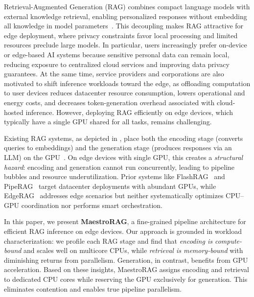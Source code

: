 Retrieval-Augmented Generation (RAG) combines compact language models with external knowledge retrieval, enabling personalized responses without embedding all knowledge in model parameters~\cite{rag_neurips}. This decoupling makes RAG attractive for edge deployment, where privacy constraints favor local processing and limited resources preclude large models. In particular, users increasingly prefer on-device or edge-based AI systems because sensitive personal data can remain local, reducing exposure to centralized cloud services and improving data privacy guarantees. At the same time, service providers and corporations are also motivated to shift inference workloads toward the edge, as offloading computation to user devices reduces datacenter resource consumption, lowers operational and energy costs, and decreases token-generation overhead associated with cloud-hosted inference.
However, deploying RAG efficiently on edge devices, which typically have a single GPU shared for all  tasks, remains challenging.


Existing RAG systems, as depicted in , place both the encoding stage (converts queries to embeddings) and the generation stage (produces responses via an LLM) on the GPU~\cite{jin2024flashrag, jiang2024piperag}. On edge devices with single GPU, this creates a \emph{structural hazard}: encoding and generation cannot run concurrently, leading to pipeline bubbles and resource underutilization. Prior systems like FlashRAG~\cite{jin2024flashrag} and PipeRAG~\cite{jiang2024piperag} target datacenter deployments with abundant GPUs, while EdgeRAG~\cite{EdgeRAG} addresses edge scenarios but neither systematically optimizes CPU--GPU coordination nor performs smart orchestration.

In this paper, we present \textbf{MaestroRAG}, a fine-grained pipeline architecture for efficient RAG inference on edge devices. Our approach is grounded in workload characterization: we profile each RAG stage and find that \emph{encoding is compute-bound} and scales well on multicore CPUs, while \emph{retrieval is memory-bound} with diminishing returns from parallelism. Generation, in contrast, benefits from GPU acceleration. Based on these insights, MaestroRAG assigns encoding and retrieval to dedicated CPU cores while reserving the GPU exclusively for generation. This eliminates contention and enables true pipeline parallelism.

